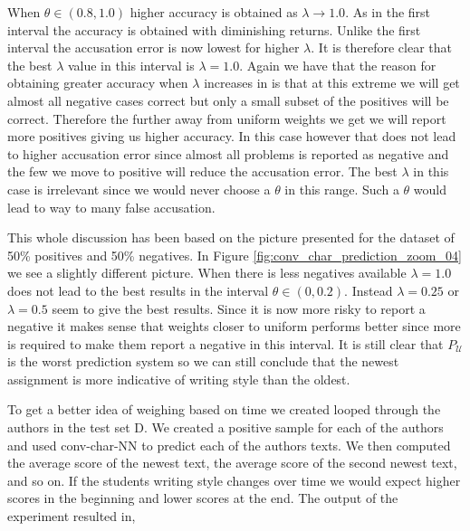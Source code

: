 \begin{description}
        When $\theta \in (0.8, 1.0)$ higher accuracy is obtained as $\lambda
        \rightarrow 1.0$. As in the first interval the accuracy is obtained with
        diminishing returns. Unlike the first interval the accusation error is
        now lowest for higher $\lambda$. It is therefore clear that the best
        $\lambda$ value in this interval is $\lambda = 1.0$. Again we have that
        the reason for obtaining greater accuracy when $\lambda$ increases in
        is that at this extreme we will get almost all negative cases correct
        but only a small subset of the positives will be correct. Therefore the
        further away from uniform weights we get we will report more positives
        giving us higher accuracy. In this case however that does not lead
        to higher accusation error since almost all problems is reported as
        negative and the few we move to positive will reduce the accusation
        error. The best $\lambda$ in this case is irrelevant since we would
        never choose a $\theta$ in this range. Such a $\theta$ would lead to way
        to many false accusation.

        This whole discussion has been based on the picture presented
        for the dataset of 50\% positives and 50\% negatives. In Figure
        \ref{fig:conv_char_prediction_zoom_04} we see a slightly different
        picture. When there is less negatives available $\lambda = 1.0$ does
        not lead to the best results in the interval $\theta \in (0, 0.2)$.
        Instead $\lambda = 0.25$ or $\lambda = 0.5$ seem to give the best
        results. Since it is now more risky to report a negative it makes sense
        that weights closer to uniform performs better since more is required
        to make them report a negative in this interval. It is still clear that
        $P_\mathcal{U}$ is the worst prediction system so we can still conclude
        that the newest assignment is more indicative of writing style than the
        oldest.

        To get a better idea of weighing based on time we created looped through
        the authors in the test set D. We created a positive sample for each
        of the authors and used \gls{conv-char-NN} to predict each of the
        authors texts. We then computed the average score of the newest text,
        the average score of the second newest text, and so on. If the students
        writing style changes over time we would expect higher scores in the
        beginning and lower scores at the end. The output of the experiment
        resulted in,


\end{description}

